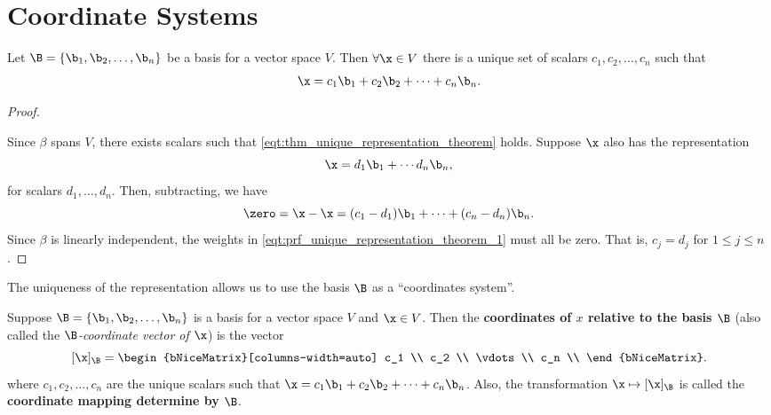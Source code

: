 
\section{Coordinate Systems}
\label{sec:coordinate_systems}

\begin{theorem}
  \label{thm:unique_representation_theorem}

  Let $\B = \{\b_1, \b_2, \ldots, \b_n\}$ be a basis for a vector space $V$.
  Then $\forall \x \in V$ there is a unique set of scalars $c_1, c_2, \ldots,
  c_n$ such that
  \begin{equation}\label{eqt:thm_unique_representation_theorem}
    \x = c_1\b_1 + c_2\b_2 + \cdots + c_n\b_n
  .\end{equation}
\end{theorem}

\begin{proof}
  \label{prf:unique_representation_theorem}

  Since $\beta$ spans $V$, there exists scalars such that
  \cref{eqt:thm_unique_representation_theorem} holds. Suppose $\x$ also has the
  representation
  \[%
    \x = d_1\b_1 + \cdots d_n\b_n
  ,\]%
  for scalars $d_1, \dots, d_n$. Then, subtracting, we have
  \begin{equation}\label{eqt:prf_unique_representation_theorem_1}
    \zero = \x - \x = (c_1 - d_1)\b_1 + \cdots + (c_n - d_n)\b_n
  .\end{equation}
  Since $\beta$ is linearly independent, the weights in
  \cref{eqt:prf_unique_representation_theorem_1} must all be zero. That is, $c_j
  = d_j$ for $1 \le j \le n$.
\end{proof}

The uniqueness of the representation allows us to use the basis $\B$ as a
``coordinates system''.

\begin{definition}
  \label{def:coordinates_of_a_vector}

  Suppose $\B = \{\b_1, \b_2, \ldots, \b_n\}$ is a basis for a vector space $V$
  and $\x \in V$. Then the \textbf{coordinates of $x$ relative to the basis
  $\B$} (also called the \textit{$\B$-coordinate vector of $\x$}) is the vector
  \[%
    [\x]_\B =
    \begin{bNiceMatrix}[columns-width=auto]
      c_1 \\
      c_2 \\
      \vdots \\
      c_n \\
    \end{bNiceMatrix}
  .\]%
  where $c_1, c_2, \ldots, c_n$ are the unique scalars such that $\x = c_1\b_1
  + c_2\b_2 + \cdots + c_n\b_n$. Also, the transformation $\x \mapsto [\x]_\B$
  is called the \textbf{coordinate mapping determine by $\B$}.
\end{definition}

